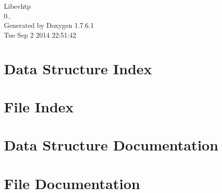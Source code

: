 \documentclass[a4paper]{book}
\begin{document}
\hypersetup{pageanchor=false,citecolor=blue}
\begin{titlepage}
\vspace*{7cm}
\begin{center}
{\Large \-Libevhtp \\[1ex]\large 0.. }\\
\vspace*{1cm}
{\large \-Generated by Doxygen 1.7.6.1}\\
\vspace*{0.5cm}
{\small Tue Sep 2 2014 22:51:42}\\
\end{center}
\end{titlepage}
\clearemptydoublepage
{}
\tableofcontents
\clearemptydoublepage
{}
\hypersetup{pageanchor=true,citecolor=blue}
\chapter{\-Data \-Structure \-Index}

\chapter{\-File \-Index}

\chapter{\-Data \-Structure \-Documentation}












\chapter{\-File \-Documentation}


\printindex
\end{document}
